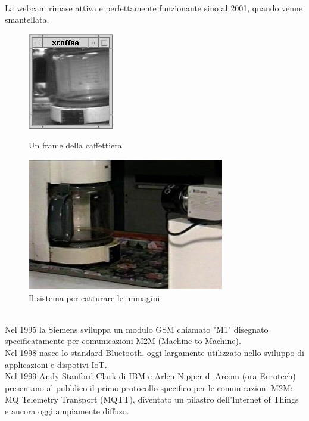 \\La webcam rimase attiva e perfettamente funzionante sino al 2001, quando venne smantellata.
\begin{figure}[!htbp]
\centering
\begin{minipage}[c]{.40\textwidth}
\centering
\includegraphics[width=.40\textwidth]{immagini/coffee-pot.png}
\caption{Un frame della caffettiera}
\end{minipage}%
\hspace{15mm}%
\begin{minipage}[c]{.40\textwidth}
\centering
\includegraphics[width=.70\textwidth]{immagini/trcp.jpg}
\caption{Il sistema per catturare le immagini}
\end{minipage}
\end{figure}
\vspace{1.0cm}
\\Nel 1995 la Siemens sviluppa un modulo GSM chiamato "M1" disegnato specificatamente per comunicazioni M2M (Machine-to-Machine).
\\Nel 1998 nasce lo standard Bluetooth, oggi largamente utilizzato nello sviluppo di applicazioni e dispotivi IoT.
\\Nel 1999 Andy Stanford-Clark di IBM e Arlen Nipper di Arcom (ora Eurotech) presentano al pubblico il primo protocollo specifico per le comunicazioni M2M: MQ Telemetry Transport (MQTT), diventato un pilastro dell'Internet of Things e ancora oggi ampiamente diffuso.
